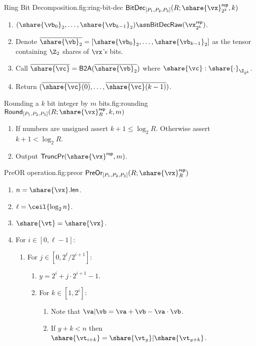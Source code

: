 \begin{Boxfig}{Ring Bit Decomposition.}{fig:ring-bit-dec}
  {$\mathsf{BitDec}_{[P_1, P_2, P_3]}(R; \share{\vx}^\mathsf{rep}_{2^k}, k)$}
  \begin{enumerate}
  \item $(\share{\vb_0}_2, \dots, \share{\vb_{k-1}}_2) \asn \mathsf{BitDecRaw}(\vx^\mathsf{rep}_{2^k})$.
  \item Denote $\overline{\share{\vb}_2} = [\share{\vb_0}_2, \dots, \share{\vb_{k-1}}_2]$ as the tensor containing $\Z_2$ shares of $\vx$'s bits.
  \item Call $\overline{\share{\vc}} = \mathsf{B2A}(\overline{\share{\vb}_2})$ where $\share{\vc}: \share{\cdot}_{\Z_{2^k}}$.
  \item Return $(\overline{\share{\vc}(0)}, \dots, \overline{\share{\vc}(k-1)})$.
\end{enumerate}
\end{Boxfig}


\begin{Boxfig}{Rounding a $k$ bit integer by $m$ bits.}{fig:rounding}
  {$\mathsf{Round}_{[P_1, P_2, P_3]}(R; \share{\vx}^\mathsf{rep}_R, k, m)$}
  \begin{enumerate}
  \item If numbers are unsigned assert $k + 1 \leq \log_2{R}$. Otherwise assert $k+1 < \log_2{R}$.
  \item Output $\mathsf{TruncPr}(\share{\vx}^\mathsf{rep}, m)$.
\end{enumerate}
\end{Boxfig}

\begin{Boxfig}{PreOR operation.}{fig:preor}
  {$\mathsf{PreOr}_{[P_1, P_2, P_3]}(R; \share{\vx}^\mathsf{rep}_R)$}
  \begin{enumerate}
    \item $n = \share{\vx}.\mathsf{len}$.
    \item $\ell = \ceil{\log_2{n}}$.
    \item $\share{\vt} = \share{\vx}$.
    \item For $i \in [0, \ell-1]$:
    \begin{enumerate}
      \item For $j \in [0, 2^\ell/2^{i+1}]$:
      \begin{enumerate}
        \item $y = 2^i + j \cdot 2^{i+1} - 1$.
        \item For $k \in [1, 2^i]$:
        \begin{enumerate}
            \item Note that $\va | \vb = \va + \vb - \va \cdot \vb$.
            \item If $y + k < n$ then $\share{\vt_{i+k}} = \share{\vt_y} | \share{\vt_{y + k}}$.
        \end{enumerate}
      \end{enumerate}
    \end{enumerate}
\end{enumerate}
\end{Boxfig}

